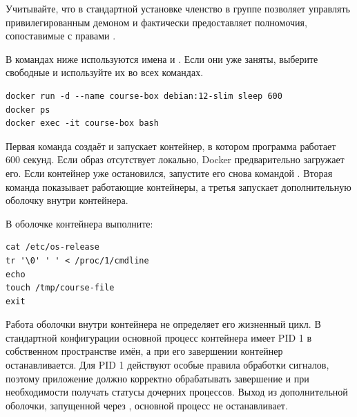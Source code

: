 Учитывайте, что в стандартной установке членство в группе  позволяет управлять привилегированным демоном и фактически предоставляет полномочия, сопоставимые с правами .

В командах ниже используются имена  и . Если они уже заняты, выберите свободные и используйте их во всех командах.

\par\addvspace{10pt}\noindent\begin{minipage}{\linewidth}
\begin{verbatim}
docker run -d --name course-box debian:12-slim sleep 600
docker ps
docker exec -it course-box bash
\end{verbatim}
\end{minipage}\par\addvspace{10pt}

Первая команда создаёт и запускает контейнер, в котором программа  работает 600 секунд. Если образ отсутствует локально, Docker предварительно загружает его. Если контейнер уже остановился, запустите его снова командой . Вторая команда показывает работающие контейнеры, а третья запускает дополнительную оболочку внутри контейнера.

\par\addvspace{10pt}\noindent\begin{minipage}{\linewidth}
\setlength{\parindent}{0pt}\noindent\hspace*{1.25cm}В оболочке контейнера выполните:\par\kern 10pt
\begin{verbatim}
cat /etc/os-release
tr '\0' ' ' < /proc/1/cmdline
echo
touch /tmp/course-file
exit
\end{verbatim}
\end{minipage}\par\addvspace{10pt}

Работа оболочки внутри контейнера не определяет его жизненный цикл. В стандартной конфигурации основной процесс контейнера имеет PID 1 в собственном пространстве имён, а при его завершении контейнер останавливается. Для PID 1 действуют особые правила обработки сигналов, поэтому приложение должно корректно обрабатывать завершение и при необходимости получать статусы дочерних процессов. Выход из дополнительной оболочки, запущенной через , основной процесс не останавливает.

